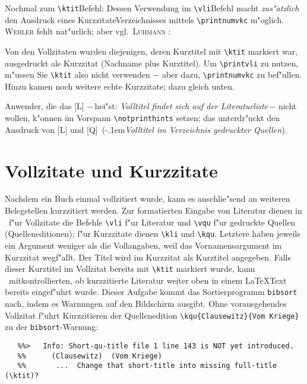 \documentclass[12pt,a4paper]{article}
\begin{document}
 \vspace{2.75ex}\noindent
 Nochmal zum \verb|\ktit|\hy Befehl: Dessen Verwendung im \verb|\vli|\hy Befehl 
 macht \textit{zus"atzlich} den Ausdruck eines Kurzzitate\hy Verzeichnisses mittels 
 \verb|\printnumvkc| m"oglich. \textsc{Wehler} fehlt nat"urlich; 
 aber vgl.\ \textsc{Luhmann} :

 \vspace{1.5ex}\label{vkc}{\footnotesize \batwocolitemdefs\printnumvkclist}

 \newpage
 \noindent
 Von den Vollzitaten wurden diejenigen, deren Kurztitel mit \verb|\ktit| markiert 
 war, ausgedruckt als Kurzzitat (Nachname plus Kurztitel). Um \verb|\printvli| zu 
 nutzen, m"ussen Sie \verb|\ktit| also nicht verwenden $-$ aber dazu,
 \verb|\printnumvkc| zu bef"ullen. Hinzu kamen noch weitere echte Kurzzitate; 
 dazu gleich unten.

 Anwender, die das [L] $-$\,hei"st: \textit{Volltitel findet sich auf der Literaturliste}\,$-$ nicht 
 wollen, k"onnen im Vorspann \verb|\notprinthints| setzen; das unterdr"uckt den Ausdruck 
 von [L] und [Q] \,(\kern-.1em\textit{Volltitel im Verzeichnis gedruckter Quellen}).



\section{Vollzitate und Kurzzitate}\label{Sect1}

 Nachdem ein Buch einmal vollzitiert wurde, kann es anschlie"send an
 weiteren Belegstellen kurzzitiert werden. Zur formatierten Eingabe von
 Literatur dienen in \BibArts\ f"ur Vollzitate die Befehle \verb|\vli| f"ur
 Literatur und \verb|\vqu| f"ur gedruckte Quellen (Quelleneditionen); f"ur
 Kurzzitate dienen \verb|\kli| und \verb|\kqu|. Letztere haben jeweils ein
 Argument weniger als die Vollangaben, weil das Vornamensargument im
 Kurzzitat wegf"allt. Der Titel wird im Kurzzitat als Kurztitel angegeben.
 Falls dieser Kurztitel im Vollzitat bereits mit \verb|\ktit| markiert
 wurde, kann \BibArts\ mitkontrollierten, ob kurzzitierte Literatur weiter
 oben in einem \LaTeX\hy Text bereits eingef"uhrt wurde. Dieser Aufgabe kommt
 das Sortierprogramm \verb|bibsort| nach, indem es Warnungen auf den
 Bildschirm ausgibt. Ohne vorausgehendes Vollzitat f"uhrt Kurzzitieren der
 Quellenedition \verb|\kqu{Clausewitz}{Vom Kriege}| zu der
 \verb|bibsort|-Warnung:

  {\scriptsize\begin{verbatim}
   %%>   Info: Short-qu-title file 1 line 143 is NOT yet introduced.
   %%      (Clausewitz)  (Vom Kriege)  
   %%       ...  Change that short-title into missing full-title (\ktit)?
  \end{verbatim}}
\end{document}
